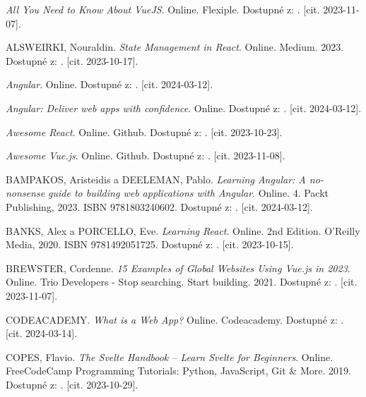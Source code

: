 

\begin{thebibliography}{99}\radkovani[1.2]\raggedright
\label{chap:literatura}

\emph{All You Need to Know About VueJS}. Online. Flexiple. Dostupné z: . [cit. 2023-11-07].

\textsc{ALSWEIRKI}, Nouraldin. \emph{State Management in React}. Online. Medium. 2023. Dostupné z: . [cit. 2023-10-17].

\emph{Angular}. Online. Dostupné z: . [cit. 2024-03-12].

\emph{Angular: Deliver web apps with confidence}. Online. Dostupné z: . [cit. 2024-03-12].

\emph{Awesome React}. Online. Github. Dostupné z: . [cit. 2023-10-23].

\emph{Awesome Vue.js}. Online. Github. Dostupné z: . [cit. 2023-11-08].

\textsc{BAMPAKOS}, Aristeidis a \textsc{DEELEMAN}, Pablo. \emph{Learning Angular: A no-nonsense guide to building web applications with Angular}. Online. 4. Packt Publishing, 2023. ISBN 9781803240602. Dostupné z: . [cit. 2024-03-12].

\textsc{BANKS}, Alex a \textsc{PORCELLO}, Eve. \emph{Learning React}. Online. 2nd Edition. O'Reilly Media, 2020. ISBN 9781492051725. Dostupné z: . [cit. 2023-10-15].

\textsc{BREWSTER}, Cordenne. \emph{15 Examples of Global Websites Using Vue.js in 2023}. Online. Trio Developers - Stop searching. Start building. 2021. Dostupné z: . [cit. 2023-11-07].

\textsc{CODEACADEMY}. \emph{What is a Web App?} Online. Codeacademy. Dostupné z: . [cit. 2024-03-14].

\textsc{COPES}, Flavio. \emph{The Svelte Handbook -- Learn Svelte for Beginners}. Online. FreeCodeCamp Programming Tutorials: Python, JavaScript, Git \& More. 2019. Dostupné z: . [cit. 2023-10-29].


\end{thebibliography}
